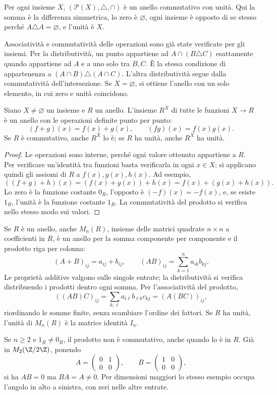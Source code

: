 \begin{esempio}
Per ogni insieme $X$, $(\mathcal P(X),\triangle,\cap)$ è un anello commutativo con unità. Qui la somma è la differenza simmetrica, lo zero è $\varnothing$, ogni insieme è opposto di se stesso perché $A\triangle A=\varnothing$, e l'unità è $X$.

Associatività e commutatività delle operazioni sono già state verificate per gli insiemi. Per la distributività, un punto appartiene ad $A\cap(B\triangle C)$ esattamente quando appartiene ad $A$ e a uno solo tra $B,C$. È la stessa condizione di appartenenza a $(A\cap B)\triangle(A\cap C)$. L'altra distributività segue dalla commutatività dell'intersezione. Se $X=\varnothing$, si ottiene l'anello con un solo elemento, in cui zero e unità coincidono.
\end{esempio}

\begin{proposizione}
Siano $X\ne\varnothing$ un insieme e $R$ un anello. L'insieme $R^X$ di tutte le funzioni $X\to R$ è un anello con le operazioni definite punto per punto:
\[
(f+g)(x)=f(x)+g(x),\qquad(fg)(x)=f(x)g(x).
\]
Se $R$ è commutativo, anche $R^X$ lo è; se $R$ ha unità, anche $R^X$ ha unità.
\end{proposizione}
\begin{proof}
Le operazioni sono interne, perché ogni valore ottenuto appartiene a $R$. Per verificare un'identità tra funzioni basta verificarla in ogni $x\in X$; si applicano quindi gli assiomi di $R$ a $f(x),g(x),h(x)$. Ad esempio,
\[
((f+g)+h)(x)=(f(x)+g(x))+h(x)=f(x)+(g(x)+h(x)).
\]
Lo zero è la funzione costante $0_R$, l'opposto è $(-f)(x)=-f(x)$, e, se esiste $1_R$, l'unità è la funzione costante $1_R$. La commutatività del prodotto si verifica nello stesso modo sui valori.
\end{proof}

\begin{esempio}
Se $R$ è un anello, anche $M_n(R)$, insieme delle matrici quadrate $n\times n$ a coefficienti in $R$, è un anello per la somma componente per componente e il prodotto riga per colonna:
\[
(A+B)_{ij}=a_{ij}+b_{ij},\qquad(AB)_{ij}=\sum_{k=1}^n a_{ik}b_{kj}.
\]
Le proprietà additive valgono sulle singole entrate; la distributività si verifica distribuendo i prodotti dentro ogni somma. Per l'associatività del prodotto,
\[
((AB)C)_{ij}=\sum_{k,\ell}a_{i\ell}b_{\ell k}c_{kj}
            =(A(BC))_{ij},
\]
riordinando le somme finite, senza scambiare l'ordine dei fattori. Se $R$ ha unità, l'unità di $M_n(R)$ è la matrice identità $I_n$.

Se $n\ge2$ e $1_R\ne0_R$, il prodotto non è commutativo, anche quando lo è in $R$. Già in $M_2(\Z/2\Z)$, ponendo
\[
A=\begin{pmatrix}0&1\\0&0\end{pmatrix},\qquad
B=\begin{pmatrix}1&0\\0&0\end{pmatrix},
\]
si ha $AB=0$ ma $BA=A\ne0$. Per dimensioni maggiori lo stesso esempio occupa l'angolo in alto a sinistra, con zeri nelle altre entrate.
\end{esempio}


